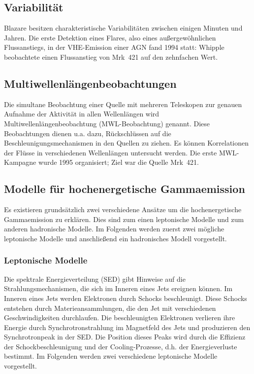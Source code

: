\subsection{Variabilität}
Blazare besitzen charakteristische Variabilitäten zwischen einigen Minuten und Jahren.
Die erste Detektion eines Flares, also eines außergewöhnlichen Flussanstiegs, in der VHE-Emission einer AGN fand 1994 statt:
Whipple beobachtete einen Flussanstieg von Mrk~421 auf den zehnfachen Wert.\cite{Weekes}\cite{Mrk421_Outburst}

\subsection{Multiwellenlängenbeobachtungen}
Die simultane Beobachtung einer Quelle mit mehreren Teleskopen zur genauen Aufnahme der Aktivität in allen Wellenlängen wird Multiwellenlängenbeobachtung (MWL-Beobachtung) genannt. 
Diese Beobachtungen dienen u.a. dazu, Rückschlüssen auf die Beschleunigungsmechanismen in den Quellen zu ziehen.
Es können Korrelationen der Flüsse in verschiedenen Wellenlängen untersucht werden.
Die erste MWL-Kampagne wurde 1995 organisiert; Ziel war die Quelle Mrk~421.\cite{Weekes}

\subsection{Modelle für hochenergetische Gammaemission}
Es existieren grundsätzlich zwei verschiedene Ansätze um die hochenergetische Gammaemission zu erklären.
Dies sind zum einen leptonische Modelle und zum anderen hadronische Modelle.
Im Folgenden werden zuerst zwei mögliche leptonische Modelle und anschließend ein hadronisches Modell vorgestellt.

\subsubsection{Leptonische Modelle}
Die spektrale Energieverteilung (SED) gibt Hinweise auf die Strahlungsmechanismen, die sich im Inneren eines Jets ereignen können.
Im Inneren eines Jets werden Elektronen durch Schocks beschleunigt. 
Diese Schocks entstehen durch Materieansammlungen, die den Jet mit verschiedenen Geschwindigkeiten durchlaufen.
Die beschleunigten Elektronen verlieren ihre Energie durch Synchrotronstrahlung im Magnetfeld des Jets und produzieren den Synchrotronpeak in der SED.
Die Position dieses Peaks wird durch die Effizienz der Schockbeschleunigung und der Cooling-Prozesse, d.h. der Energieverluste bestimmt. 
Im Folgenden werden zwei verschiedene leptonische Modelle vorgestellt.\cite{Weekes}


